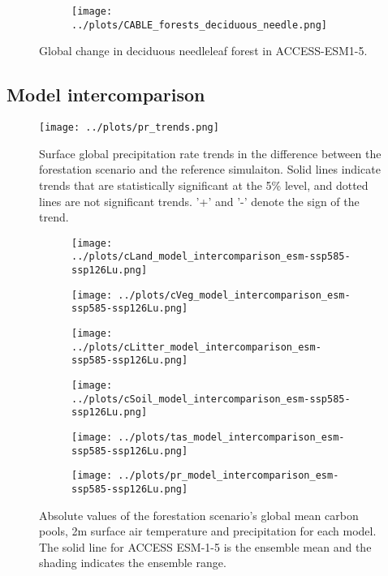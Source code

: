 \documentclass[]{article}
\begin{document}
\begin{figure}[H]
    \centering
    \begin{subfigure}[b]{0.45\linewidth}
        \texttt{[image: ../plots/CABLE\_forests\_deciduous\_needle.png]}
    \end{subfigure}
    \caption{Global change in deciduous needleleaf forest in ACCESS-ESM1-5.}
    \label{fig:ACCESS_dec_needle_cover}
\end{figure}

\subsection{Model intercomparison}

\begin{figure}[H]
    \centering
    \texttt{[image: ../plots/pr\_trends.png]}
    \caption{Surface global precipitation rate trends in the difference between the forestation scenario and the reference simulaiton. Solid lines indicate trends that are statistically significant at the 5\% level, and dotted lines are not significant trends. '+' and '-' denote the sign of the trend.}
    \label{fig:models_pr_trends}
\end{figure}

\begin{figure}[H]
    \centering
    \begin{subfigure}[b]{0.45\linewidth}
        \texttt{[image: ../plots/cLand\_model\_intercomparison\_esm-ssp585-ssp126Lu.png]}
    \end{subfigure}
    \begin{subfigure}[b]{0.45\linewidth}
        \texttt{[image: ../plots/cVeg\_model\_intercomparison\_esm-ssp585-ssp126Lu.png]}
    \end{subfigure}
    \begin{subfigure}[b]{0.45\linewidth}
        \texttt{[image: ../plots/cLitter\_model\_intercomparison\_esm-ssp585-ssp126Lu.png]}
    \end{subfigure}
    \begin{subfigure}[b]{0.45\linewidth}
        \texttt{[image: ../plots/cSoil\_model\_intercomparison\_esm-ssp585-ssp126Lu.png]}
    \end{subfigure}
    \begin{subfigure}[b]{0.45\linewidth}
        \texttt{[image: ../plots/tas\_model\_intercomparison\_esm-ssp585-ssp126Lu.png]}
    \end{subfigure}
    \begin{subfigure}[b]{0.45\linewidth}
        \texttt{[image: ../plots/pr\_model\_intercomparison\_esm-ssp585-ssp126Lu.png]}
    \end{subfigure}
    \caption{Absolute values of the forestation scenario's global mean carbon pools, 2m surface air temperature and precipitation for each model. The solid line for ACCESS ESM-1-5 is the ensemble mean and the shading indicates the ensemble range.}
    \label{fig:models_absolute}
\end{figure}
\end{document}
